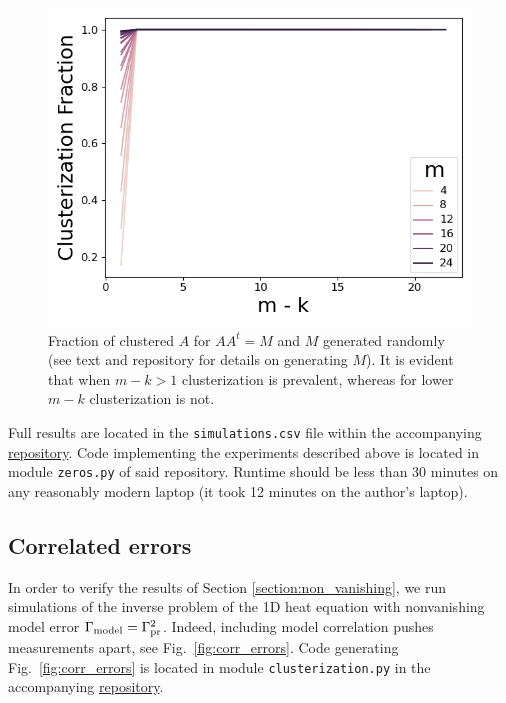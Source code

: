 \documentclass[ba]{imsart}
\theoremstyle{plain}
\theoremstyle{definition}
\theoremstyle{remark}
\begin{document}
\begin{figure}
    \centering
    \includegraphics[height=0.5\textwidth]{figs/simulations.png}
    \caption{Fraction of clustered $A$ for $AA^t = M$ and $M$
      generated randomly (see text and repository for details on
      generating $M$). It is evident that when $m-k > 1$ clusterization
      is prevalent, whereas for lower $m-k$ clusterization is not.}
  \label{fig:sim_AAt}
\end{figure}

Full results are located in the \texttt{simulations.csv} file within
the accompanying \href{https://github.com/yairdaon/OED}{repository}.
Code implementing the experiments described above is located in module
\texttt{zeros.py} of said repository. Runtime should be less than 30
minutes on any reasonably modern laptop (it took 12 minutes on the
author's laptop).





\subsection{Correlated errors}\label{subsec:corr_errors_sims}
In order to verify the results of Section \ref{section:non_vanishing},
we run simulations of the inverse problem of the 1D heat equation with
nonvanishing model error \(\Gamma_{\textup{model}} = \Gamma_{\textup{pr}}^2 \). Indeed, including
model correlation pushes measurements apart, see
Fig.~\ref{fig:corr_errors}. Code generating Fig.~\ref{fig:corr_errors}
is located in module \texttt{clusterization.py} in the accompanying
\href{https://github.com/yairdaon/OED}{repository}.
\end{document}
